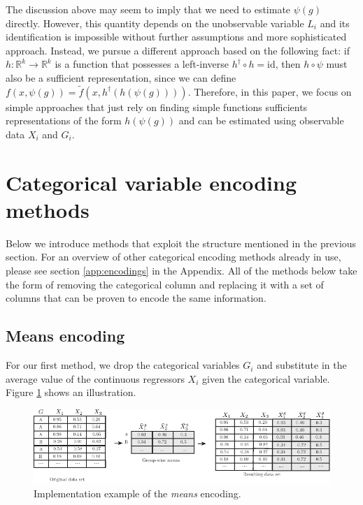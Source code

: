 \documentclass{article}
\theoremstyle{plain}
\theoremstyle{definition}
\theoremstyle{remark}
\begin{document}
The discussion above may seem to imply that we need to estimate $\psi(g)$ directly. However, this quantity depends on the unobservable variable $L_{i}$ and its identification is  impossible without further assumptions and more sophisticated approach. Instead, we pursue a different approach based on the following fact: if $h: \mathbb{R}^{k} \rightarrow \mathbb{R}^{k}$ is a function that possesses a left-inverse $h^{\dagger} \circ h = \text{id}$, then $h \circ \psi$ must also be a sufficient representation, since we can define $f(x, \psi(g)) = \tilde{f}(x, h^{\dagger}(h(\psi(g))))$. Therefore, in this paper, we focus on simple approaches that just rely on finding simple functions sufficients representations of the form $h(\psi(g))$ and can be estimated using observable data $X_{i}$ and $G_{i}$.








\section{Categorical variable encoding methods}
\label{sec:categorical_encoding}

Below we introduce methods that exploit the structure mentioned in the previous section. For an overview of other categorical encoding methods already in use, please see section \ref{app:encodings} in the Appendix. All of the methods below take the form of removing the categorical column and replacing it with a set of columns that can be proven to encode the same information.


\subsection{Means encoding}
\label{subsec:means}

For our first method, we drop the categorical variables $G_{i}$ and substitute in the average value of the continuous regressors $X_{i}$ given the categorical variable. Figure \ref{fig:means_encoding} shows an illustration.


\begin{figure}[H]
  \centering
  \includegraphics[width=\textwidth]{figures/means_encoding.pdf}
  \caption{Implementation example of the \emph{means} encoding.}
  \label{fig:means_encoding}
\end{figure}
\end{document}
